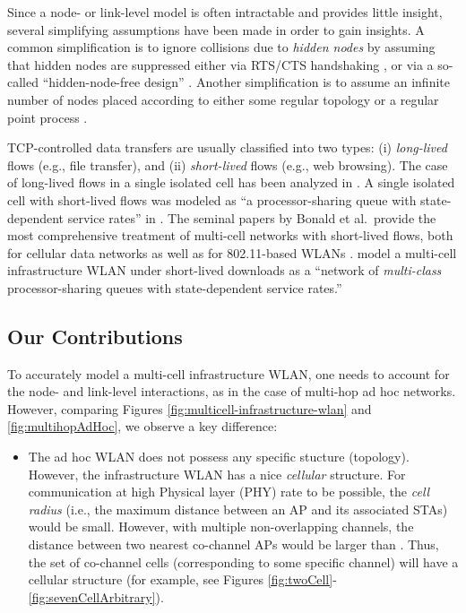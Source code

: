 \documentclass[10pt,a4paper,journal]{IEEEtran}
\theoremstyle{definition}
\theoremstyle{remark}
\theoremstyle{plain}
\begin{document}
Since a node- or link-level model is often intractable and provides little insight, several simplifying assumptions have been made in order to gain insights. A common simplification is to ignore collisions due to \textit{hidden nodes} by assuming that hidden nodes are suppressed either via RTS/CTS handshaking \cite{wanet.durvy09selfOrganization,wanet.bonald08multicellprocsharing}, or via a so-called ``hidden-node-free design'' \cite{wanet.jiang-liew08MobComp-HNEN,wanet.liew_etal09mobicom-capacity-wireless-networks,wanet.liew_etal09ICCback-of-the-envelope}. Another simplification is to assume an infinite number of nodes placed according to either some regular topology \cite{wanet.durvy09selfOrganization} or a regular point process \cite{wanet.nguyen07stochGeom}. 

TCP-controlled data transfers are usually classified into two types: (i) \textit{long-lived} flows (e.g., file transfer), and (ii) \textit{short-lived} flows (e.g., web browsing). The case of long-lived flows in a single isolated cell has been analyzed in \cite{wanet.harsha07WiNet,wanet.bruno08TCPeqvSatModel}. A single isolated cell with short-lived flows was modeled as ``a processor-sharing queue with state-dependent service rates'' in \cite{wanet.litjens_etalITC03integrated_packet_flow,wanet.miorandi_etal06http_over_wlans}. The seminal papers by Bonald et al.~provide the most comprehensive treatment of multi-cell networks with short-lived flows, both for cellular data networks \cite{wanet.bonald_etal04multicell-cellular} as well as for 802.11-based WLANs \cite{wanet.bonald08multicellprocsharing}. \cite{wanet.bonald08multicellprocsharing} model a multi-cell infrastructure WLAN under short-lived downloads as a ``network of \textit{multi-class} processor-sharing queues with state-dependent service rates.''




\subsection{Our Contributions} 

To accurately model a multi-cell infrastructure WLAN, one needs to account for the node- and link-level interactions, as in the case of multi-hop ad hoc networks. However, comparing Figures \ref{fig:multicell-infrastructure-wlan} and \ref{fig:multihopAdHoc}, we observe a key difference: 
\begin{itemize}
\item The ad hoc WLAN does not possess any specific stucture (topology). However, the infrastructure WLAN has a nice \textit{cellular} structure. For communication at high Physical layer (PHY) rate to be possible, the \textit{cell radius}  (i.e., the maximum distance between an AP and its associated STAs) would be small. However, with multiple non-overlapping channels, the distance  between two nearest co-channel APs would be larger than . Thus, the set of co-channel cells (corresponding to some specific channel) will have a cellular structure (for example, see Figures \ref{fig:twoCell}-\ref{fig:sevenCellArbitrary}). 
\end{itemize}
\end{document}
